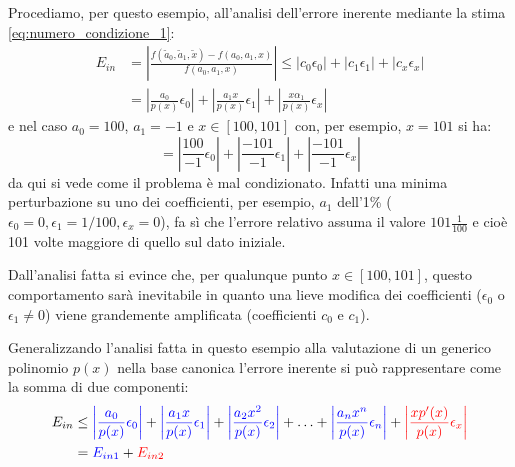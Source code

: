 \documentclass{article}
\begin{document}
\begin{example}
    \vskip 0.1in 
    Procediamo, per questo esempio, all'analisi dell'errore inerente mediante
    la stima \ref{eq:numero_condizione_1}:
    \begin{equation*}
       \begin{aligned}
            E_{in} &= \left\lvert \frac{f(\tilde{a}_0, \tilde{a}_1,
            \tilde{x})-f(a_0,a_1,x)}{f(a_0,a_1,x)}\right\rvert \leq
            \left\lvert c_0\epsilon_0\right\rvert + 
            \left\lvert c_1\epsilon_1\right\rvert + 
            \left\lvert c_x\epsilon_x\right\rvert\\ 
            &= \left\lvert \frac{a_0}{p(x)}\epsilon_0\right\rvert +
            \left\lvert \frac{a_1x}{p(x)}\epsilon_1\right\rvert +
            \left\lvert \frac{x\alpha_1}{p(x)}\epsilon_x\right\rvert
       \end{aligned} 
    \end{equation*}
    e nel caso $a_0=100$, $a_1=-1$ e $x\in[100,101]$ con, per esempio, $x=101$
    si ha:
    $$=\left\lvert \frac{100}{-1}\epsilon_0\right\rvert + \left\lvert
    \frac{-101}{-1}\epsilon_1\right\rvert +
    \left\lvert \frac{-101}{-1}\epsilon_x\right\rvert$$
    da qui si vede come il problema è mal condizionato. Infatti una minima 
    perturbazione su uno dei coefficienti, per esempio, 
    $a_1$ dell'1\% ($\epsilon_0=0,\epsilon_1=1/100,\epsilon_x=0$),
    fa sì che l'errore relativo assuma il valore $101 \frac{1}{100}$ e cioè
    101 volte maggiore di quello sul dato iniziale.

    Dall'analisi fatta si evince che, per qualunque punto $x\in[100,101]$,
    questo comportamento sarà inevitabile in quanto una lieve modifica dei
    coefficienti ($\epsilon_0$ o $\epsilon_1\neq 0$) viene grandemente
    amplificata (coefficienti $c_0\text{ e }c_1$).
\end{example}
Generalizzando l'analisi fatta in questo esempio alla valutazione di un
generico polinomio $p(x)$ nella base canonica l'errore inerente si può
rappresentare come la somma di due componenti:
\begin{equation*}
    \begin{aligned}
        E_{in} &\leq 
        {\color{blue}\left\lvert \frac{a_0}{p(x)}\epsilon_0\right\rvert} + 
        {\color{blue}\left\lvert \frac{a_1x}{p(x)}\epsilon_1\right\rvert} + 
        {\color{blue}\left\lvert \frac{a_2x^2}{p(x)}\epsilon_2\right\rvert} + \ldots + 
        {\color{blue}\left\lvert \frac{a_nx^n}{p(x)}\epsilon_n\right\rvert} + 
        {\color{red}\left\lvert \frac{xp'(x)}{p(x)}\epsilon_x \right\rvert}\\
        &={\color{blue}E_{in1}}+{\color{red}E_{in2}}
    \end{aligned}
\end{equation*}
\end{document}
